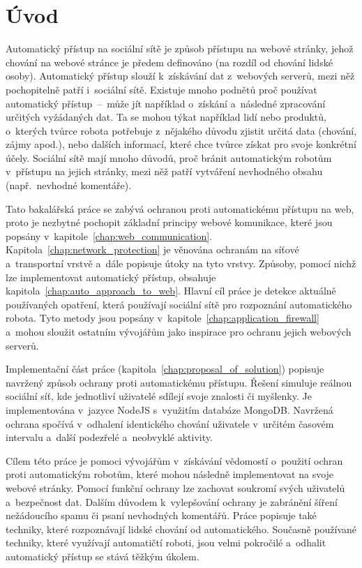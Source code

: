 \chapter{Úvod}

Automatický přístup na sociální sítě je způsob přístupu na webové stránky, jehož chování na webové stránce je předem definováno (na rozdíl od chování lidské osoby). Automatický přístup slouží k~získávání dat z~webových serverů, mezi něž pochopitelně patří i~sociální sítě. Existuje mnoho podnětů proč používat automatický přístup~--~může jít například o~získání a~následné zpracování určitých vyžádaných dat. Ta se mohou týkat například lidí nebo produktů, o~kterých tvůrce robota potřebuje z~nějakého důvodu zjistit určitá data (chování, zájmy apod.), nebo dalších informací, které chce tvůrce získat pro svoje konkrétní účely. Sociální sítě mají mnoho důvodů, proč bránit automatickým robotům v~přístupu na jejich stránky, mezi něž patří vytváření nevhodného obsahu (např.~nevhodné komentáře).

Tato bakalářská práce se zabývá ochranou proti automatickému přístupu na web, proto je nezbytné pochopit základní principy webové komunikace, které jsou popsány v~kapitole~\ref{chap:web_communication}. Kapitola~\ref{chap:network_protection} je věnována ochranám na síťové a~transportní vrstvě a~dále popisuje útoky na tyto vrstvy. Způsoby, pomocí nichž lze implementovat automatický přístup, obsahuje kapitola~\ref{chap:auto_approach_to_web}. Hlavní cíl práce je detekce aktuálně používaných opatření, která používají sociální sítě pro rozpoznání automatického robota. Tyto metody jsou popsány v~kapitole~\ref{chap:application_firewall} a~mohou sloužit ostatním vývojářům jako inspirace pro ochranu jejich webových serverů. 

Implementační část práce (kapitola~\ref{chap:proposal_of_solution}) popisuje navržený způsob ochrany proti automatickému přístupu. Řešení simuluje reálnou sociální síť, kde jednotliví uživatelé sdílejí svoje znalosti či myšlenky. Je implementována v~jazyce NodeJS s~využitím databáze MongoDB. Navržená ochrana spočívá v~odhalení identického chování uživatele v~určitém časovém intervalu a~další podezřelé a~neobvyklé aktivity. 

Cílem této práce je pomoci vývojářům v~získávání vědomostí o~použití ochran proti automatickým robotům, které mohou následně implementovat na svoje webové stránky. Pomocí funkční ochrany lze zachovat soukromí svých uživatelů a~bezpečnost dat. Dalším důvodem k~vylepšování ochrany je zabránění šíření nežádoucího spamu či psaní nevhodných komentářů. Práce popisuje také techniky, které rozpoznávají lidské chování od automatického. Současně používané techniky, které využívají automatičtí roboti, jsou velmi pokročilé a~odhalit automatický přístup se stává těžkým úkolem.

